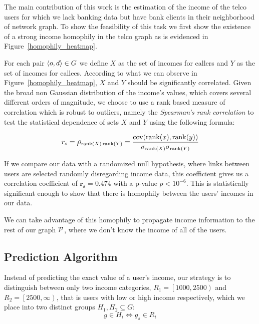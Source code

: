 The main contribution of this work is the estimation of the income of the telco users for which we lack banking data but have bank clients in their neighborhood of network graph. To show the feasibility of this task we first show the existence of a strong income homophily in the telco graph as is evidenced in Figure~\ref{homophily_heatmap}.

For each pair \( \left< o, d \right> \in \mathlarger{G} \) we define \( X \) as the set of incomes for callers and \( Y \) as the set of incomes for callees. According to what we can observe in Figure~\ref{homophily_heatmap}, \( X \) and \( Y \) should be significantly correlated. Given the broad non Gaussian distribution of the income's values, which covers several different  orders of magnitude, we choose to use a rank based measure of correlation which is robust to outliers, namely the \textit{Spearman's rank correlation} %
to test the statistical dependence of sets \( X \) and \( Y \) using the following formula:

\begin{equation}
r_s = \mathlarger{\rho}_{\operatorname{rank}(X) \operatorname{rank}(Y)} = \frac{\operatorname{cov}(\operatorname{rank}(x), \operatorname{rank}(y))}{\sigma_{\operatorname{rank}(X)} \sigma_{\operatorname{rank}(Y)}}
\label{spearman}
\end{equation}

If we compare our data with a randomized null hypothesis, where links between users are selected randomly disregarding income data, this coefficient gives us a correlation coefficient of $\mathbf{r_s = 0.474} $ with a p-value $ p < 10^{-6} $. This is statistically significant enough to show that there is homophily between the users' incomes in our data.

We can take advantage of this homophily to propagate income information to the rest of our graph $ \mathcal{P} $, where we don't know the income of all of the users.


\subsection{Prediction Algorithm}

Instead of predicting the exact value of a user's income, our strategy is to distinguish between only two income categories, $R_1 = \left[1000, 2500\right)$ and $R_2 = \left[2500, \infty\right)$, that is users with low or high income respectively, which we place into two distinct groups $ H_1, H_2 \subseteq G$:
\[
	g \in H_i \iff g_s \in R_i
\]

